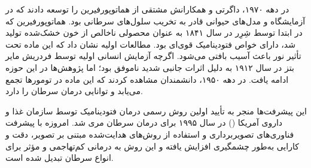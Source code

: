 در دهه ۱۹۷۰، داگرتی و همکارانش مشتقی از هماتوپورفیرین را توسعه دادند که در آزمایشگاه و مدل‌های حیوانی قادر به تخریب سلول‌های سرطانی بود. هماتوپورفیرین که در ابتدا توسط شِرِر در سال ۱۸۴۱ به عنوان محصولی ناخالص از خون خشک‌شده تولید شد، دارای خواص فتودینامیک قوی‌ای بود. مطالعات اولیه نشان داد که این ماده تحت تأثیر نور باعث آسیب بافتی می‌شود. اگرچه آزمایش انسانی اولیه توسط فردریش مایر بتز
در سال ۱۹۱۲ به دلیل اثرات جانبی شدید ناموفق بود؛ اما پژوهش‌ها در این حوزه ادامه یافت. در دهه ۱۹۵۰، دانشمندان مشاهده کردند که این ماده در تومورها تجمع می‌یابد و توانایی درمان سرطان را دارد\cite{pdt-theory-to-application}. 

این پیشرفت‌ها منجر به تأیید اولین روش رسمی درمان فتودینامیک توسط سازمان غذا و داروی آمریکا () در سال ۱۹۹۵ برای درمان سرطان مری شد. امروزه با پیشرفت فناوری‌های تصویربرداری و استفاده از روش‌های هدایت‌شده مبتنی بر تصویر، دقت و کارایی
به‌طور چشمگیری افزایش یافته و این روش به درمانی کم‌تهاجمی و مؤثر برای انواع سرطان تبدیل شده است\cite{pdt-theory-to-application,pdt-Lu2009581}.
 
 
 
 
 
 
 
 
 
 
 
 
 
 
 
 
 
 
 
 
 
 
 
 
 
 
 
 
 
 
 
 
 
 
 
 
 
 
 
 
 
 
 
 
 
 